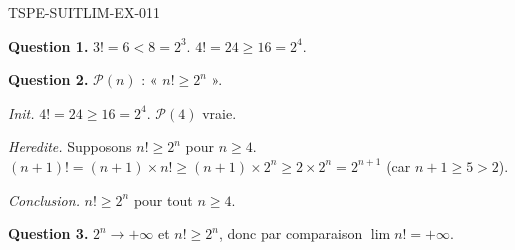\begin{corrige}{TSPE-SUITLIM-EX-011}

\textbf{Question 1.} $3! = 6 < 8 = 2^3$. $4! = 24 \geq 16 = 2^4$.

\textbf{Question 2.} $\mathcal{P}(n)$ : « $n! \geq 2^n$ ».

\textit{Init.} $4! = 24 \geq 16 = 2^4$. $\mathcal{P}(4)$ vraie.

\textit{Heredite.} Supposons $n! \geq 2^n$ pour $n \geq 4$. $(n+1)! = (n+1) \times n! \geq (n+1) \times 2^n \geq 2 \times 2^n = 2^{n+1}$ (car $n+1 \geq 5 > 2$).

\textit{Conclusion.} $n! \geq 2^n$ pour tout $n \geq 4$.

\textbf{Question 3.} $2^n \to +\infty$ et $n! \geq 2^n$, donc par comparaison $\boxed{\lim n! = +\infty}$.

\end{corrige}
